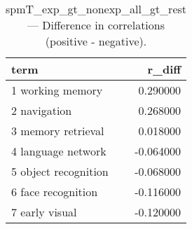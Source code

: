 \begin{table}
\caption{spmT_exp_gt_nonexp_all_gt_rest — Difference in correlations (positive - negative).}
\label{tab:spmT_exp_gt_nonexp_all_gt_rest_diff}
\begin{tabular}{lr}
\toprule
term & r\_diff \\
\midrule
1 working memory & 0.290000 \\
2 navigation & 0.268000 \\
3 memory retrieval & 0.018000 \\
4 language network & -0.064000 \\
5 object recognition & -0.068000 \\
6 face recognition & -0.116000 \\
7 early visual & -0.120000 \\
\bottomrule
\end{tabular}
\end{table}
